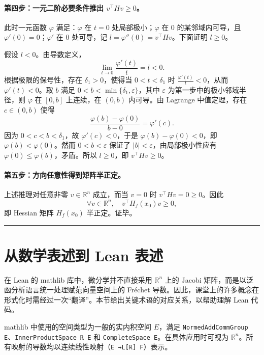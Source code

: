 ﻿\documentclass[UTF8,a4paper,zihao=-4]{ctexart}
\begin{document}
\paragraph{第四步：一元二阶必要条件推出 \(v^{\top}Hv\ge0\)。}此时一元函数 \(\varphi\) 满足：\(\varphi\) 在 \(t=0\) 处局部极小；\(\varphi\) 在 \(0\) 的某邻域内可导，且 \(\varphi'(0)=0\)；\(\varphi'\) 在 \(0\) 处可导，记 \(l=\varphi''(0)=v^{\top}Hv\)。下面证明 \(l\ge0\)。

假设 \(l<0\)。由导数定义，
\[
\lim_{t\to0}\frac{\varphi'(t)}{t}=l<0.
\]
根据极限的保号性，存在 \(\delta_1>0\)，使得当 \(0<t<\delta_1\) 时 \(\frac{\varphi'(t)}{t}<0\)，从而 \(\varphi'(t)<0\)。取 \(b\) 满足 \(0<b<\min\{\delta_1,\varepsilon\}\)，其中 \(\varepsilon\) 为第一步中的极小邻域半径，则 \(\varphi\) 在 \([0,b]\) 上连续，在 \((0,b)\) 内可导。由 Lagrange 中值定理，存在 \(c\in(0,b)\) 使得
\[
\frac{\varphi(b)-\varphi(0)}{b-0}=\varphi'(c).
\]
因为 \(0<c<b<\delta_1\)，故 \(\varphi'(c)<0\)，于是 \(\varphi(b)-\varphi(0)<0\)，即 \(\varphi(b)<\varphi(0)\)。然而 \(0<b<\varepsilon\) 保证了 \(|b|<\varepsilon\)，由局部极小性应有 \(\varphi(0)\le\varphi(b)\)，矛盾。所以 \(l\ge0\)，即 \(v^{\top}Hv\ge0\)。

\paragraph{第五步：方向任意性得到矩阵半正定。}上述推理对任意非零 \(v\in\mathbb{R}^n\) 成立，而当 \(v=0\) 时 \(v^{\top}Hv=0\ge0\)。因此
\[
\forall v\in\mathbb{R}^n,\quad v^{\top}H_f(x_0)v\ge0,
\]
即 Hessian 矩阵 \(H_f(x_0)\) 半正定。证毕。

\bigskip\hrule\bigskip

\section{从数学表述到 Lean 表述}
在 Lean 的 mathlib 库中，微分学并不直接采用 \(\mathbb{R}^n\) 上的 Jacobi 矩阵，而是以泛函分析语言统一处理赋范向量空间上的 Fréchet 导数。因此，课堂上的许多概念在形式化时需经过一次“翻译”。本节给出关键术语的对应关系，以帮助理解 Lean 代码。

mathlib 中使用的空间类型为一般的实内积空间 \(E\)，满足 \texttt{NormedAddCommGroup E}、\texttt{InnerProductSpace ℝ E} 和 \texttt{CompleteSpace E}。在具体应用时可视为 \(\mathbb{R}^n\)。所有映射的导数均以连续线性映射（\texttt{E →L[ℝ] F}）表示。
\end{document}
